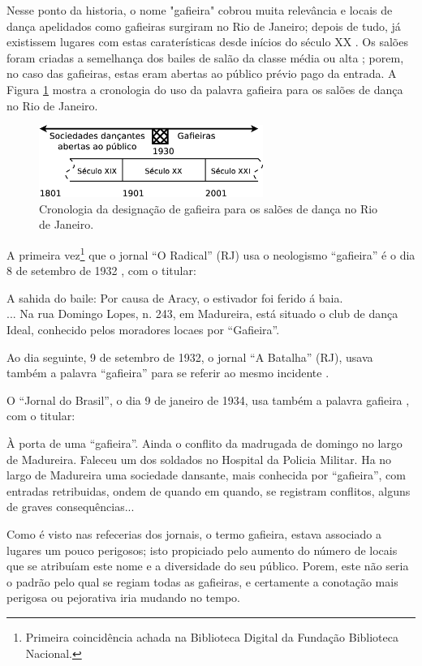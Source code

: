 Nesse ponto da historia, 
o nome "gafieira" cobrou muita relevância e locais de dança apelidados como gafieiras surgiram no Rio de Janeiro;
depois de tudo, já existissem lugares com estas caraterísticas desde inícios do século XX \cite[pp. 49]{diniz2003almanaque}.
Os salões foram criadas a semelhança dos bailes de salão da classe média ou alta \cite[pp. 78]{coutinho2006cronistas}; 
porem, no caso das gafieiras, estas eram abertas ao público prévio pago da entrada.
A Figura \ref{fig:gafieiracrono} mostra a cronologia do uso da palavra gafieira para os salões de dança no Rio de Janeiro.
\begin{figure}[h]
  \centering
    \includegraphics[width=0.65\textwidth]{chapters/cap-historia/gafieira-crono.eps}
  \caption{Cronologia da designação de gafieira para os salões de dança no Rio de Janeiro.}
  \label{fig:gafieiracrono}
\end{figure}

A primeira vez\footnote{Primeira coincidência achada na Biblioteca Digital da Fundação Biblioteca Nacional.} 
que o jornal ``O Radical'' (RJ) usa o neologismo ``gafieira'' 
é o dia 8 de setembro de 1932 \cite[pp. 12]{gafieirajournaloradical1},
com o titular:
\begin{tcolorbox}[breakable,colback=colorlowgray,colframe=colorlowgray]%
A sahida do baile: Por causa de Aracy, o estivador foi ferido á baia.\\
... Na rua Domingo Lopes, n. 243, em Madureira, está situado o club de dança Ideal, 
conhecido pelos moradores locaes por ``Gafieira''.
\end{tcolorbox} 
Ao dia seguinte, 9 de setembro de 1932, o jornal ``A Batalha'' (RJ), 
usava também a palavra ``gafieira'' para se referir ao mesmo incidente \cite[pp. 8]{gafieirajournalabatalha1}.

O ``Jornal do Brasil'', o dia 9 de janeiro de 1934, 
usa também a palavra gafieira \cite[pp. 11]{gafieirajournalbrasil1}, com o titular:
\begin{tcolorbox}[breakable,colback=colorlowgray,colframe=colorlowgray]%
À porta de uma ``gafieira''.
Ainda o conflito da madrugada de domingo no largo de Madureira.
Faleceu um dos soldados no Hospital da Policia Militar. 
Ha no largo de Madureira uma sociedade dansante, mais conhecida por ``gafieira'', 
com entradas retribuidas, ondem de quando em quando, se registram conflitos, 
alguns de graves consequências...
\end{tcolorbox} 
Como é visto nas refecerias dos jornais, 
o termo gafieira, estava associado a lugares um pouco perigosos;
isto propiciado pelo aumento do número de locais que se atribuíam este nome e a diversidade do seu público.
Porem, este não seria o padrão pelo qual se regiam todas as gafieiras, 
e certamente a conotação mais perigosa ou pejorativa iria mudando no tempo. 


